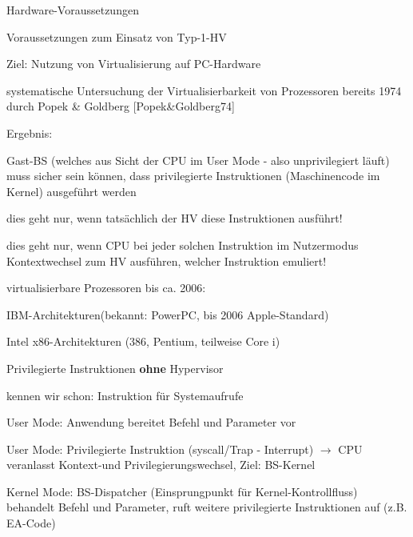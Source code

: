 \documentclass[a4paper]{article}
\newcommand{\cmark}{\ding{51}}
\newcommand{\xmark}{\ding{55}}
\begin{document}
\begin{multicols}{3}
    Hardware-Voraussetzungen

    \begin{itemize*}
        \item
        Voraussetzungen zum Einsatz von Typ-1-HV
        \begin{itemize*}
            \item Ziel: Nutzung von Virtualisierung auf PC-Hardware
            \item systematische Untersuchung der Virtualisierbarkeit von Prozessoren bereits 1974 durch Popek \& Goldberg [Popek\&Goldberg74]
            \item Ergebnis: \begin{itemize*} \item Gast-BS (welches aus Sicht der CPU im User Mode - also unprivilegiert läuft) muss sicher sein können, dass privilegierte Instruktionen (Maschinencode im Kernel) ausgeführt werden \item dies geht nur, wenn tatsächlich der HV diese Instruktionen ausführt! \item dies geht nur, wenn CPU bei jeder solchen Instruktion im Nutzermodus Kontextwechsel zum HV ausführen, welcher Instruktion emuliert! \end{itemize*}
        \end{itemize*}
        \item
        virtualisierbare Prozessoren bis ca. 2006:
        \begin{itemize*}
            \item \cmark IBM-Architekturen(bekannt: PowerPC, bis 2006 Apple-Standard)
            \item \xmark Intel x86-Architekturen (386, Pentium, teilweise Core i)
        \end{itemize*}
    \end{itemize*}

    Privilegierte Instruktionen \textbf{ohne} Hypervisor

    \begin{itemize*}
        \item
        kennen wir schon: Instruktion für Systemaufrufe
    \end{itemize*}

    \begin{enumerate*}
        \item
        User Mode: Anwendung bereitet Befehl und Parameter vor
        \item
        User Mode: Privilegierte Instruktion (syscall/Trap - Interrupt)
        $\rightarrow$ CPU veranlasst Kontext-und
        Privilegierungswechsel, Ziel: BS-Kernel
        \item
        Kernel Mode: BS-Dispatcher (Einsprungpunkt für Kernel-Kontrollfluss)
        behandelt Befehl und Parameter, ruft weitere privilegierte
        Instruktionen auf (z.B. EA-Code)
    \end{enumerate*}


\end{multicols}
\end{document}

